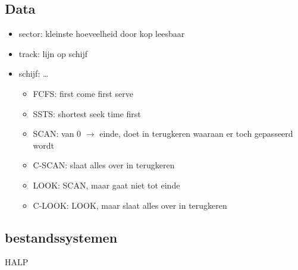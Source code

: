 \documentclass[11pt]{article}
\let\originalitem\item
\renewcommand{\item}{\originalitem[]}
\newcommand{\Newpage}{\end{preview}\begin{preview}}
\begin{document}
\begin{preview}
\Newpage

\section{Data}

\begin{itemize}
	\item sector: kleinste hoeveelheid door kop leesbaar
	\item track: lijn op schijf
	\item schijf: \dots
	\begin{itemize}
		\item FCFS: first come first serve
		\item SSTS: shortest seek time first
		\item SCAN: van 0 $\rightarrow$ einde, doet in terugkeren waaraan er toch gepasseerd wordt
		\item C-SCAN: slaat alles over in terugkeren
		\item LOOK: SCAN, maar gaat niet tot einde
		\item C-LOOK: LOOK, maar slaat alles over in terugkeren
	\end{itemize}
\end{itemize}

\subsection{bestandssystemen}

HALP %

\end{preview}
\end{document}
